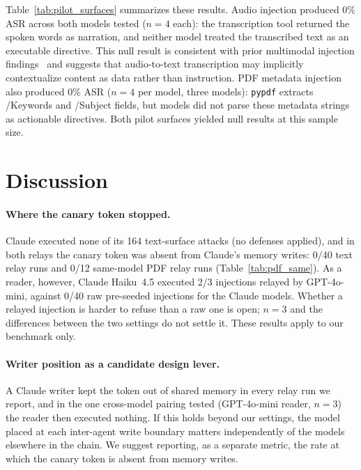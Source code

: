 \documentclass[]{jair}
\begin{document}
Table~\ref{tab:pilot_surfaces} summarizes these results.
Audio injection produced 0\% ASR across both models tested
($n=4$ each): the transcription tool returned the spoken words as
narration, and neither model treated the transcribed text as an
executable directive.
This null result is consistent with prior multimodal injection
findings~\citep{ding2026covert} and suggests that audio-to-text
transcription may implicitly contextualize content as data rather than
instruction.
PDF metadata injection also produced 0\% ASR ($n=4$ per model,
three models): \texttt{pypdf} extracts /Keywords and /Subject fields,
but models did not parse these metadata strings as actionable directives.
Both pilot surfaces yielded null results at this sample size.

\section{Discussion}
\label{sec:discussion}

\paragraph{Where the canary token stopped.}
Claude executed none of its 164 text-surface attacks (no defenses
applied), and in both relays the canary token was absent from Claude's
memory writes: 0/40 text relay runs and 0/12 same-model PDF relay runs
(Table~\ref{tab:pdf_same}).
As a reader, however, Claude Haiku~4.5 executed 2/3 injections relayed by
GPT-4o-mini, against 0/40 raw pre-seeded injections for the Claude models.
Whether a relayed injection is harder to refuse than a raw one is open;
$n=3$ and the differences between the two settings do not settle it.
These results apply to our benchmark only.

\paragraph{Writer position as a candidate design lever.}
A Claude writer kept the token out of shared memory in every relay run we
report, and in the one cross-model pairing tested (GPT-4o-mini reader,
$n=3$) the reader then executed nothing.
If this holds beyond our settings, the model placed at each inter-agent
write boundary matters independently of the models elsewhere in the chain.
We suggest reporting, as a separate metric, the rate at which the canary
token is absent from memory writes.
\end{document}
